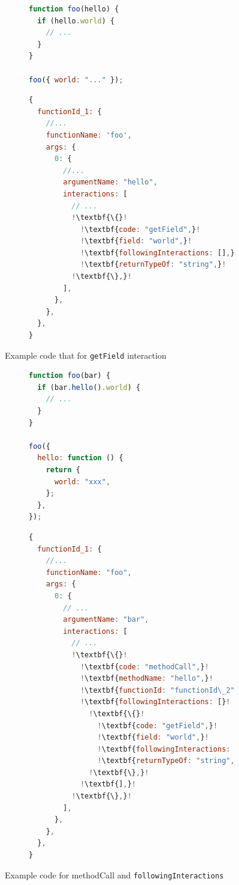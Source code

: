 \documentclass[sigconf]{acmart}
\begin{document}
\begin{figure}[t]
  \centering
  \begin{subfigure}[t]{0.48\linewidth}
    \begin{lstlisting}[language=JavaScript,numbers=none]
function foo(hello) {
  if (hello.world) {
    // ...
  }
}

foo({ world: "..." });
    \end{lstlisting}
  \end{subfigure}
  \hfill
  \begin{subfigure}[t]{0.48\linewidth}
    \begin{lstlisting}[language=JavaScript,numbers=none,escapechar=!]
{
  functionId_1: {
    //...
    functionName: 'foo',
    args: {
      0: {
        //...
        argumentName: "hello",
        interactions: [
          // ...
          !\textbf{\{}!
            !\textbf{code: "getField",}!
            !\textbf{field: "world",}!
            !\textbf{followingInteractions: [],}!
            !\textbf{returnTypeOf: "string",}!
          !\textbf{\},}!
        ],
      },
    },
  },
}
    \end{lstlisting}
  \end{subfigure}
  \caption{
      Example code that for \texttt{getField} interaction
    }
  \label{fig:example-get-field-interaction}
\end{figure}

\begin{figure}[t]
  \begin{subfigure}[t]{0.48\linewidth}
      \begin{lstlisting}[language=JavaScript,numbers=none]
function foo(bar) {
  if (bar.hello().world) {
    // ...
  }
}

foo({
  hello: function () {
    return {
      world: "xxx",
    };
  },
});    
      \end{lstlisting}
    \end{subfigure}
    \hfill
    \begin{subfigure}[t]{0.48\linewidth}
      \begin{lstlisting}[language=JavaScript,numbers=none,escapechar=!]
{
  functionId_1: {
    //...
    functionName: "foo",
    args: {
      0: {
        // ...
        argumentName: "bar",
        interactions: [
          // ...
          !\textbf{\{}!
            !\textbf{code: "methodCall",}!
            !\textbf{methodName: "hello",}!
            !\textbf{functionId: "functionId\_2",}!
            !\textbf{followingInteractions: [}!
              !\textbf{\{}!
                !\textbf{code: "getField",}!
                !\textbf{field: "world",}!
                !\textbf{followingInteractions: [],}!
                !\textbf{returnTypeOf: "string",}!
              !\textbf{\},}!
            !\textbf{],}!
          !\textbf{\},}!
        ],
      },
    },
  },
}        
      \end{lstlisting}
    \end{subfigure}
  \caption{Example code for \texttt{}{methodCall} and \texttt{followingInteractions}}
  \label{fig:example-method-call-interaction}
  \end{figure}
\end{document}

